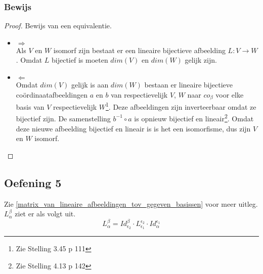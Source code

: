 \documentclass[lineaire_algebra_oplossingen.tex]{subfiles}
\begin{document}
\subsubsection*{Bewijs}
\begin{proof}
Bewijs van een equivalentie.
\begin{itemize}
\item $\Rightarrow$\\
Als $V$ en $W$ isomorf zijn bestaat er een lineaire bijectieve afbeelding $L:V\rightarrow W$. Omdat $L$ bijectief is moeten $dim(V)$ en $dim(W)$ gelijk zijn.
\item $\Leftarrow$\\
Omdat $dim(V)$ gelijk is aan $dim(W)$ bestaan er lineaire bijectieve co\"ordinaatafbeeldingen $a$ en $b$ van respectievelijk $V$, $W$ naar $co_\beta$ voor elke basis van $V$ respectievelijk $W$\footnote{Zie Stelling 3.45 p 111}. Deze afbeeldingen zijn inverteerbaar omdat ze bijectief zijn. De samenstelling $b^{-1}\circ a$ is opnieuw bijectief en lineair\footnote{Zie Stelling 4.13 p 142}. Omdat deze nieuwe afbeelding bijectief en lineair is is het een isomorfisme, dus zijn $V$ en $W$ isomorf.
\end{itemize}
\end{proof}

\subsection{Oefening 5}
Zie \ref{matrix_van_lineaire_afbeeldingen_tov_gegeven_basissen} voor meer uitleg.
$L_{\alpha}^\beta$ ziet er als volgt uit.
\[
L_{\alpha}^\beta = Id_{\epsilon_2}^\beta \cdot L_{\epsilon_1}^{\epsilon_2} \cdot Id_{\alpha}^{\epsilon_1}
\]
\end{document}
